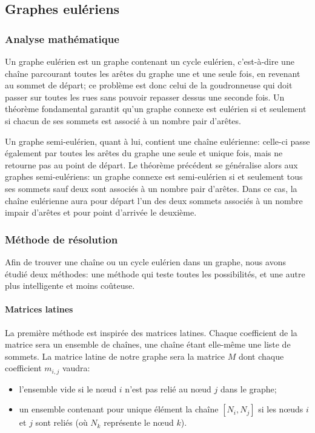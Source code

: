 \subsection{Graphes eulériens}
  \subsubsection{Analyse mathématique}
    Un graphe eulérien est un graphe contenant un cycle eulérien, c'est-à-dire
    une chaîne parcourant toutes les arêtes du graphe une et une seule fois, en
    revenant au sommet de départ; ce problème est donc celui de la goudronneuse
    qui doit passer sur toutes les rues sans pouvoir repasser dessus une
    seconde fois. Un théorème fondamental garantit qu'un graphe connexe est
    eulérien si et seulement si chacun de ses sommets est associé à un nombre
    pair d'arêtes.

    Un graphe semi-eulérien, quant à lui, contient une chaîne eulérienne:
    celle-ci passe également par toutes les arêtes du graphe une seule et
    unique fois, mais ne retourne pas au point de départ. Le théorème précédent
    se généralise alors aux graphes semi-eulériens: un graphe connexe est
    semi-eulérien si et seulement tous ses sommets sauf deux sont associés à un
    nombre pair d'arêtes. Dans ce cas, la chaîne eulérienne aura pour départ
    l'un des deux sommets associés à un nombre impair d'arêtes et pour point
    d'arrivée le deuxième.

  \subsubsection{Méthode de résolution}
    Afin de trouver une chaîne ou un cycle eulérien dans un graphe, nous avons
    étudié deux méthodes: une méthode qui teste toutes les possibilités,
    et une autre plus intelligente et moins coûteuse.

    \paragraph{Matrices latines}
      La première méthode est inspirée des matrices latines. Chaque coefficient
      de la matrice sera un ensemble de chaînes, une chaîne étant elle-même une
      liste de sommets. La matrice latine de notre graphe sera la matrice $M$
      dont chaque coefficient $m_{i,j}$ vaudra:
      \begin{itemize}
        \item l'ensemble vide si le nœud $i$ n'est pas relié au nœud $j$ dans
          le graphe;
        \item un ensemble contenant pour unique élément la chaîne  $[N_i,N_j]$
          si les nœuds $i$ et $j$ sont reliés (où $N_k$ représente le nœud
          $k$).
      \end{itemize}

